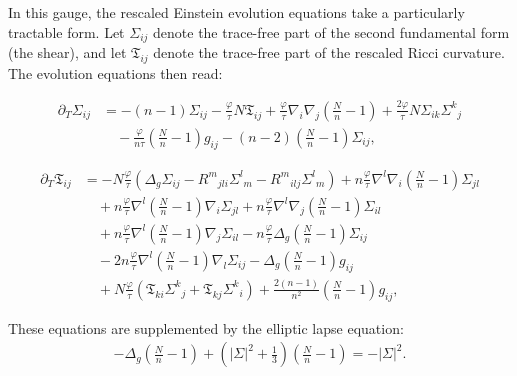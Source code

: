 \documentclass{amsart}
\begin{document}
\vspace{1em}
\noindent
In this gauge, the rescaled Einstein evolution equations take a particularly tractable form. Let $\Sigma_{ij}$ denote the trace-free part of the second fundamental form (the shear), and let $\mathfrak{T}_{ij}$ denote the trace-free part of the rescaled Ricci curvature. The evolution equations then read:

\begin{align}
\label{eq:curvature1}
\partial_T \Sigma_{ij} &= -(n-1)\Sigma_{ij} - \frac{\varphi}{\tau} N \mathfrak{T}_{ij} + \frac{\varphi}{\tau} \nabla_i \nabla_j \left( \frac{N}{n} - 1 \right) + \frac{2\varphi}{\tau} N \Sigma_{ik} \Sigma^k{}_j \\
&\quad - \frac{\varphi}{n\tau} \left( \frac{N}{n} - 1 \right) g_{ij} - (n-2) \left( \frac{N}{n} - 1 \right) \Sigma_{ij}\nonumber, 
\end{align}

\begin{align}
 \label{eq:curvature2}
\partial_T \mathfrak{T}_{ij} &= -N\frac{\varphi}{\tau} \left( \Delta_g \Sigma_{ij} - R^m{}_{jli} \Sigma^l{}_m - R^m{}_{ilj} \Sigma^l{}_m \right) + n \frac{\varphi}{\tau} \nabla^l \nabla_i \left( \frac{N}{n} - 1 \right) \Sigma_{jl} \\
&\quad + n \frac{\varphi}{\tau} \nabla^l \left( \frac{N}{n} - 1 \right) \nabla_i \Sigma_{jl} + n \frac{\varphi}{\tau} \nabla^l \nabla_j \left( \frac{N}{n} - 1 \right) \Sigma_{il} \nonumber \\
&\quad + n \frac{\varphi}{\tau} \nabla^l \left( \frac{N}{n} - 1 \right) \nabla_j \Sigma_{il} - n \frac{\varphi}{\tau} \Delta_g \left( \frac{N}{n} - 1 \right) \Sigma_{ij} \nonumber \\
&\quad - 2n \frac{\varphi}{\tau} \nabla^l \left( \frac{N}{n} - 1 \right) \nabla_l \Sigma_{ij} - \Delta_g \left( \frac{N}{n} - 1 \right) g_{ij} \nonumber \\
&\quad + N \frac{\varphi}{\tau} \left( \mathfrak{T}_{ki} \Sigma^k{}_j + \mathfrak{T}_{kj} \Sigma^k{}_i \right) + \frac{2(n-1)}{n^2} \left( \frac{N}{n} - 1 \right) g_{ij}\nonumber, 
\end{align}

\noindent
These equations are supplemented by the elliptic lapse equation:
\begin{align}
\label{eq:lapse3}
- \Delta_g \left( \frac{N}{n} - 1 \right) + \left( |\Sigma|^2 + \frac{1}{3} \right) \left( \frac{N}{n} - 1 \right) = - |\Sigma|^2.
\end{align}
\end{document}
